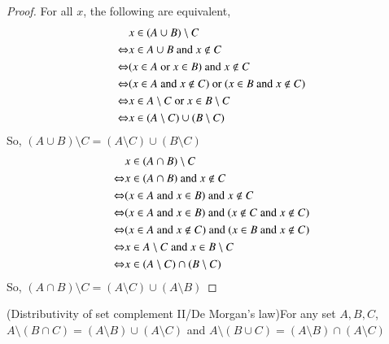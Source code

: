 \begin{proof}
    For all $x$, the following are equivalent, 
    \begin{align*}
        & x\in(A\cup B)\setminus C\\
        \Leftrightarrow & x\in A\cup B \text{ and }x\not\in C\\
        \Leftrightarrow & (x\in A\text{ or }x\in B)\text{ and }x\not\in C\\
        \Leftrightarrow & (x\in A\text{ and } x\not\in C)\text{ or } (x\in B\text{ and } x\not\in C)\\
        \Leftrightarrow & x\in A\setminus C\text{ or } x\in B\setminus C\\
        \Leftrightarrow & x\in(A\setminus C)\cup(B\setminus C)
    \end{align*}
    So, $(A\cup B)\setminus C = (A\setminus C)\cup (B\setminus C)$
    \begin{align*}
        & x\in(A\cap B)\setminus C\\
        \Leftrightarrow & x\in(A\cap B)\text{ and } x\not\in C\\
        \Leftrightarrow & (x\in A\text{ and } x\in B)\text{ and } x\not\in C\\
        \Leftrightarrow & (x\in A \text{ and } x\in B)\text{ and } (x\not\in C \text{ and } x\not\in C)\\
        \Leftrightarrow & (x\in A\text{ and } x\not\in C)\text{ and } (x\in B\text{ and } x\not\in C)\\
        \Leftrightarrow & x\in A\setminus C \text{ and } x\in B\setminus C\\
        \Leftrightarrow & x\in (A\setminus C)\cap (B\setminus C)
    \end{align*}
    So, $(A\cap B)\setminus C = (A\setminus C)\cup (A\setminus B)$
\end{proof}
\begin{prop}
    {(Distributivity of set complement II/De Morgan's law)For any set $A,B,C$, $A\setminus(B\cap C) = (A\setminus B) \cup (A\setminus C)$ and $A\setminus (B\cup C) = (A\setminus B)\cap (A\setminus C)$}
\end{prop}
